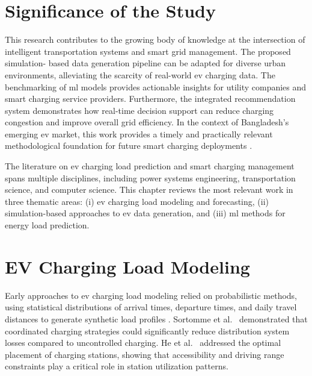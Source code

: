 \documentclass{thesis-library}
\begin{document}
\section{Significance of the Study}

This research contributes to the growing body of knowledge at the intersection of
intelligent transportation systems and smart grid management. The proposed simulation-
based data generation pipeline can be adapted for diverse urban environments, alleviating
the scarcity of real-world \Gls{ev} charging data. The benchmarking of \Gls{ml} models
provides actionable insights for utility companies and smart charging service providers.
Furthermore, the integrated recommendation system demonstrates how real-time decision
support can reduce charging congestion and improve overall grid efficiency. In the context
of Bangladesh's emerging \Gls{ev} market, this work provides a timely and practically
relevant methodological foundation for future smart charging deployments
\cite{ev_bangladesh2023}.


The literature on \Gls{ev} charging load prediction and smart charging management spans
multiple disciplines, including power systems engineering, transportation science, and
computer science. This chapter reviews the most relevant work in three thematic areas:
(i) \Gls{ev} charging load modeling and forecasting, (ii) simulation-based approaches to
\Gls{ev} data generation, and (iii) \Gls{ml} methods for energy load prediction.

\section{EV Charging Load Modeling}

Early approaches to \Gls{ev} charging load modeling relied on probabilistic methods,
using statistical distributions of arrival times, departure times, and daily travel
distances to generate synthetic load profiles \cite{parking_area_ev2022}. Sortomme
et al.~\cite{peak_load_shaving2021} demonstrated that coordinated charging strategies
could significantly reduce distribution system losses compared to uncontrolled charging.
He et al.~\cite{charging_station_placement2021} addressed the optimal placement of
charging stations, showing that accessibility and driving range constraints play a critical
role in station utilization patterns.
\end{document}
